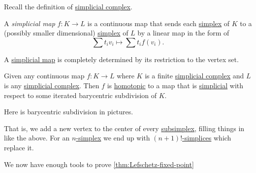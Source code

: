 \begin{prev}
	Recall the definition of \hyperref[def:simplicial-complex]{simplicial complex}.
\end{prev}

\begin{definition}\label{def:simplicial-map}
	A \emph{simplicial map} \(f \colon K \to L\) is a continuous map that sends each \hyperref[def:standard-simplex]{simplex} of \(K\) to a (possibly smaller dimensional)
	\hyperref[def:standard-simplex]{simplex} of \(L\) by a linear map in the form of
	\[
		\sum t_iv_i \mapsto \sum t_if(v_i).
	\]
\end{definition}
\begin{remark}
	A \hyperref[def:simplicial-map]{simplicial map} is completely determined by its restriction to the vertex set.
\end{remark}

\begin{theorem}\label{thm:simplicial-approximation-theorem}
	Given any continuous map \(f \colon K \to L\) where \(K\) is a finite \hyperref[def:simplicial-complex]{simplicial complex} and
	\(L\) is any \hyperref[def:simplicial-complex]{simplicial complex}. Then \(f\) is \hyperref[def:homotopic]{homotopic} to a map
	that is \hyperref[def:simplicial-map]{simplicial} with respect to some iterated barycentric subdivision of \(K\).
\end{theorem}
\begin{eg}
	Here is barycentric subdivision in pictures.
	\begin{figure}[H]
		\centering
		\label{fig:eg:barycentric-subdivision}
	\end{figure}
	That is, we add a new vertex to the center of every \hyperref[def:subsimplex]{subsimplex}, filling things in like the above.
	For an \hyperref[def:standard-simplex]{\(n\)-simplex} we end up with \hyperref[def:standard-simplex]{\((n + 1)!\)-simplices} which replace it.
\end{eg}

We now have enough tools to prove \autoref{thm:Lefschetz-fixed-point}

